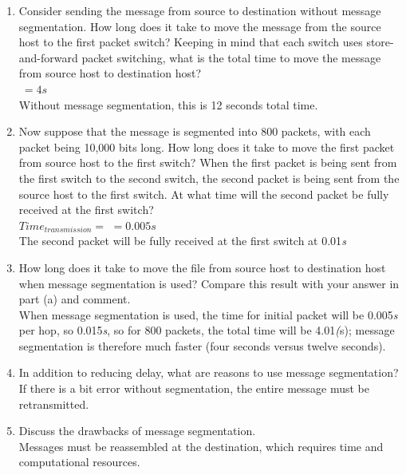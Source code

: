 \documentclass[12pt]{article}
\begin{document}
\begin{enumerate}
    \begin{enumerate}
        \item Consider sending the message from source to destination without message segmentation. How long does it take to move the message from the source host to the first packet switch? Keeping in mind that each switch uses store-and-forward packet switching, what is the total time to move the message from source host to destination host?\\[1em]
        \(\ =4s\)\\[0.5em]
        Without message segmentation, this is 12 seconds total time.
        \item Now suppose that the message is segmented into 800 packets, with each packet being 10,000 bits long. How long does it take to move the first packet from source host to the first switch? When the first packet is being sent from the first switch to the second switch, the second packet is being sent from the source host to the first switch. At what time will the second packet be fully received at the first switch?\\[1em]
        \(
        Time_{transmission}=
        \)
        \(
        =0.005s
        \)\\[0.5em]
        The second packet will be fully received at the first switch at 0.01\textit{s}
        \item How long does it take to move the file from source host to destination host when message segmentation is used? Compare this result with your answer in part (a) and comment.\\[1em]
        When message segmentation is used, the time for initial packet will be 0.005\textit{s} per hop, so 0.015\textit{s}, so for 800 packets, the total time will be 4.01\textit(s); message segmentation is therefore much faster (four seconds versus twelve seconds).
        \item In addition to reducing delay, what are reasons to use message segmentation?\\[1em]
        If there is a bit error without segmentation, the entire message must be retransmitted.
        \item Discuss the drawbacks of message segmentation.\\[1em]
        Messages must be reassembled at the destination, which requires time and computational resources.
    \end{enumerate}

\end{enumerate}
\end{document}
